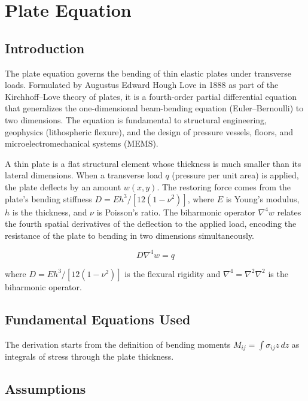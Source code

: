 \chapter{Plate Equation}

\section*{Introduction}

The plate equation governs the bending of thin elastic plates under transverse loads. Formulated by Augustus Edward Hough Love in 1888 as part of the Kirchhoff--Love theory of plates, it is a fourth-order partial differential equation that generalizes the one-dimensional beam-bending equation (Euler--Bernoulli) to two dimensions. The equation is fundamental to structural engineering, geophysics (lithospheric flexure), and the design of pressure vessels, floors, and microelectromechanical systems (MEMS).

A thin plate is a flat structural element whose thickness is much smaller than its lateral dimensions. When a transverse load $q$ (pressure per unit area) is applied, the plate deflects by an amount $w(x,y)$. The restoring force comes from the plate's bending stiffness $D = Eh^{3}/[12(1-\nu^{2})]$, where $E$ is Young's modulus, $h$ is the thickness, and $\nu$ is Poisson's ratio. The biharmonic operator $\nabla^{4}w$ relates the fourth spatial derivatives of the deflection to the applied load, encoding the resistance of the plate to bending in two dimensions simultaneously.


\begin{equation}
\boxed{\; D\nabla^{4}w = q\;}
\label{eq:plate}
\end{equation}

where $D = Eh^{3}/[12(1-\nu^{2})]$ is the flexural rigidity and $\nabla^{4} = \nabla^{2}\nabla^{2}$ is the biharmonic operator.

\section*{Fundamental Equations Used}

The derivation starts from the definition of bending moments $M_{ij} = \int \sigma_{ij}z\,dz$ as integrals of stress through the plate thickness.

\section*{Assumptions}


